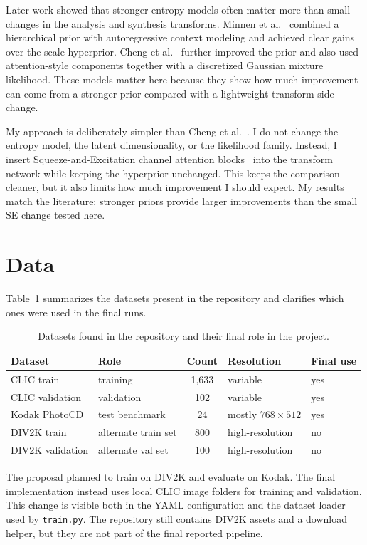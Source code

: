 \documentclass[10pt]{article}
\begin{document}
Later work showed that stronger entropy models often matter more than small changes in the analysis and synthesis transforms. Minnen et al.~\cite{minnen2018joint} combined a hierarchical prior with autoregressive context modeling and achieved clear gains over the scale hyperprior. Cheng et al.~\cite{cheng2020anchor} further improved the prior and also used attention-style components together with a discretized Gaussian mixture likelihood. These models matter here because they show how much improvement can come from a stronger prior compared with a lightweight transform-side change.

My approach is deliberately simpler than Cheng et al.~\cite{cheng2020anchor}. I do not change the entropy model, the latent dimensionality, or the likelihood family. Instead, I insert Squeeze-and-Excitation channel attention blocks~\cite{hu2018senet} into the transform network while keeping the hyperprior unchanged. This keeps the comparison cleaner, but it also limits how much improvement I should expect. My results match the literature: stronger priors provide larger improvements than the small SE change tested here.

\section{Data}
Table~\ref{tab:data-summary} summarizes the datasets present in the repository and clarifies which ones were used in the final runs.

\begin{table}[t]
\centering
\small
\caption{Datasets found in the repository and their final role in the project.}
\label{tab:data-summary}
\begin{tabularx}{\linewidth}{@{}l l c l l@{}}
\toprule
Dataset & Role & Count & Resolution & Final use \\
\midrule
CLIC train & training & 1,633 & variable & yes \\
CLIC validation & validation & 102 & variable & yes \\
Kodak PhotoCD & test benchmark & 24 & mostly \(768\times512\) & yes \\
DIV2K train & alternate train set & 800 & high-resolution & no \\
DIV2K validation & alternate val set & 100 & high-resolution & no \\
\bottomrule
\end{tabularx}
\end{table}

The proposal planned to train on DIV2K and evaluate on Kodak. The final implementation instead uses local CLIC image folders for training and validation. This change is visible both in the YAML configuration and the dataset loader used by \texttt{train.py}. The repository still contains DIV2K assets and a download helper, but they are not part of the final reported pipeline.
\end{document}
